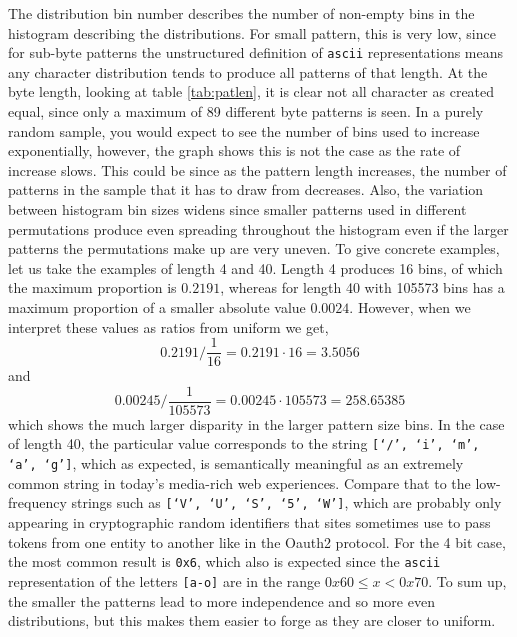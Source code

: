 \documentclass[ %
                    author={Samuel Russell},
                supervisor={Prof. Bogdan Warinschi},
                    degree={MEng},
                     title={Innocuous Ciphertexts},
                  subtitle={The DE-CENSOR Scheme},
                      type={research},
                      year={2018} ]{dissertation}
\begin{document}
The distribution bin number describes the number of non-empty bins in the histogram describing the distributions.
For small pattern, this is very low, since for sub-byte patterns the unstructured definition of \texttt{ascii} representations means any character distribution tends to produce all patterns of that length.
At the byte length, looking at table \ref{tab:patlen}, it is clear not all character as created equal, since only a maximum of 89 different byte patterns is seen.
In a purely random sample, you would expect to see the number of bins used to increase exponentially, however, the graph shows this is not the case as the rate of increase slows.
This could be since as the pattern length increases, the number of patterns in the sample that it has to draw from decreases.
Also, the variation between histogram bin sizes widens since smaller patterns used in different permutations produce even spreading throughout the histogram even if the larger patterns the permutations make up are very uneven.
To give concrete examples, let us take the examples of length 4 and 40.
Length 4 produces 16 bins, of which the maximum proportion is $0.2191$, whereas for length 40 with 105573 bins has a maximum proportion of a smaller absolute value $0.0024$.
However, when we interpret these values as ratios from uniform we get,
$$0.2191 / {\frac{1}{16}} = 0.2191 \cdot 16 = 3.5056$$
and
$${0.00245} / {\frac{1}{105573}} = 0.00245 \cdot 105573 = 258.65385$$
which shows the much larger disparity in the larger pattern size bins.
In the case of length 40, the particular value corresponds to the string \texttt{[`/', `i', `m', `a', `g']}, which as expected, is semantically meaningful as an extremely common string in today's media-rich web experiences. Compare that to the low-frequency strings such as \texttt{[`V', `U', `S', `5', `W']}, which are probably only appearing in cryptographic random identifiers that sites sometimes use to pass tokens from one entity to another like in the Oauth2 protocol.
For the 4 bit case, the most common result is \texttt{0x6}, which also is expected since the \texttt{ascii} representation of the letters \texttt{[a-o]} are in the range $0x60 \leq x < 0x70$.
To sum up, the smaller the patterns lead to more independence and so more even distributions, but this makes them easier to forge as they are closer to uniform.
\end{document}
